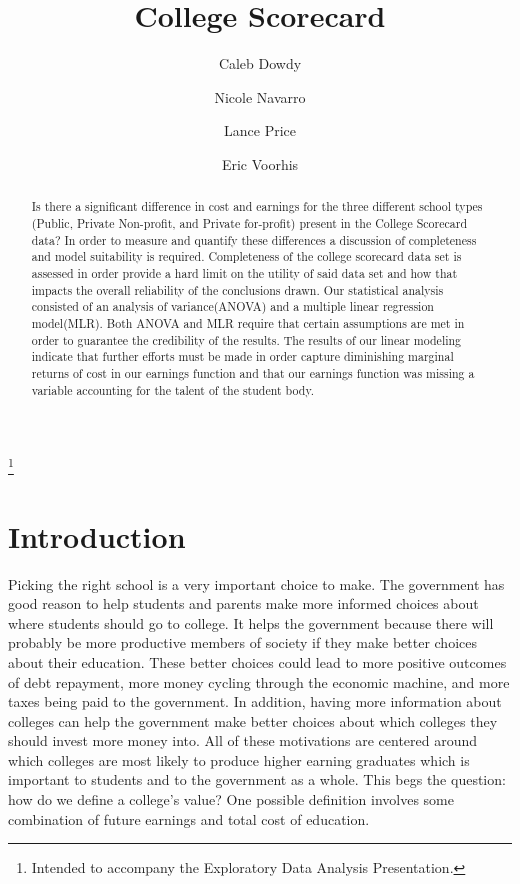 \documentclass[%
 reprint,
 amsmath,amssymb,
 aps,
]{revtex4-1}
\begin{document}
\title{College Scorecard}%
\thanks{Intended to accompany the Exploratory Data Analysis Presentation.}%

\author{Caleb Dowdy}
\author{Nicole Navarro}
\author{Lance Price}
\author{Eric Voorhis}


\begin{abstract}
Is there a significant difference in cost and earnings for the three different school types (Public, Private Non-profit, and Private for-profit) present in the College Scorecard data? In order to measure and quantify these differences a discussion of completeness and model suitability is required. Completeness of the college scorecard data set is assessed in order provide a hard limit on the utility of said data set and how that impacts the overall reliability of the conclusions drawn. Our statistical analysis consisted of an analysis of variance(ANOVA) and a multiple linear regression model(MLR). Both ANOVA and MLR require that certain assumptions are met in order to guarantee the credibility of the results. The results of our linear modeling indicate that further efforts must be made in order capture diminishing marginal returns of cost in our earnings function and that our earnings function was missing a variable accounting for the talent of the student body.
\end{abstract}

\maketitle

\section{\label{sec:level1}Introduction}
Picking the right school is a very important choice to make.  The government has good reason to help students and parents make more informed choices about where students should go to college.  It helps the government because there will probably be more productive members of society if they make better choices about their education.  These better choices could lead to more positive outcomes of debt repayment, more money cycling through the economic machine, and more taxes being paid to the government.  In addition, having more information about colleges can help the government make better choices about which colleges they should invest more money into.  All of these motivations are centered around which colleges are most likely to produce higher earning graduates which is important to students and to the government as a whole.  This begs the question: how do we define a college's value?  One possible definition involves some combination of future earnings and total cost of education.
\end{document}
